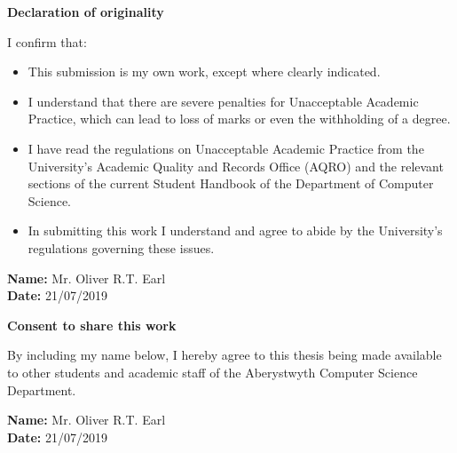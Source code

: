 \thispagestyle{empty}


\begin{center}
    {\LARGE\bf Declaration of originality}
\end{center}

I confirm that:

\begin{itemize}
\item{This submission is my own work, except where 
clearly indicated.}

\item{I understand that there are severe penalties for Unacceptable Academic Practice, which can lead to loss of marks or even the withholding of a degree.}
 
\item{I have read the regulations on Unacceptable Academic Practice from the University's Academic Quality and Records Office (AQRO) and the relevant sections of the current Student Handbook of the Department of Computer Science.}
 
\item{In submitting this work I understand and agree to abide by the University's regulations governing these issues.}
\end{itemize}

\vspace{2em}
\textbf{Name:} Mr. Oliver R.T. Earl  \\

\vspace{1em}
\textbf{Date:} 21/07/2019 \\

\vspace{1em}
\begin{center}
    {\LARGE\bf Consent to share this work}
\end{center}

By including my name below, I hereby agree to this thesis being made available to other students and academic staff of the Aberystwyth Computer Science Department.  

\vspace{2em}
\textbf{Name:} Mr. Oliver R.T. Earl  \\

\vspace{1em}
\textbf{Date:} 21/07/2019 \\


